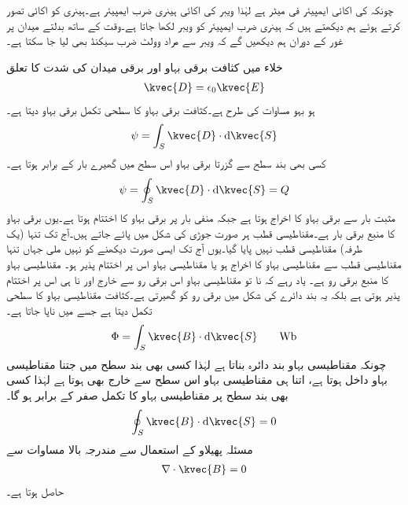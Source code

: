 چونکہ  کی اکائی ایمپیئر فی میٹر ہے لہٰذا ویبر کی اکائی ہینری ضرب ایمپیئر ہے۔ہینری کو اکائی تصور کرتے ہوئے ہم دیکھتے ہیں کہ ہینری ضرب ایمپیئر کو ویبر لکھا جاتا ہے۔وقت کے ساتھ بدلتے میدان پر غور کے دوران ہم دیکھیں گے کہ ویبر سے مراد وولٹ ضرب سیکنڈ بھی لیا جا سکتا ہے۔ 

خلاء میں کثافت برقی بہاو  اور برقی میدان کی شدت  کا تعلق
\begin{align*}
\kvec{D}=\epsilon_0 \kvec{E}
\end{align*}
ہو بہو مساوات  کی طرح ہے۔کثافت برقی بہاو کا سطحی تکمل برقی بہاو  دیتا ہے۔
\begin{align*}
\psi=\int_S \kvec{D} \cdot \dif \kvec{S}
\end{align*}
کسی بھی بند سطح سے گزرتا برقی بہاو اس سطح میں گھیرے بار  کے برابر ہوتا ہے۔
\begin{align*}
\psi=\oint_S \kvec{D} \cdot \dif \kvec{S}=Q
\end{align*}
مثبت بار سے برقی بہاو کا اخراج ہوتا ہے جبکہ منفی بار پر برقی بہاو کا اختتام ہوتا ہے۔یوں برقی بہاو کا منبع برقی بار ہے۔مقناطیسی قطب ہر صورت جوڑی کی شکل میں پائے جاتے ہیں۔آج تک تنہا (یک طرفہ) مقناطیسی قطب نہیں پایا گیا۔یوں آج تک ایسی صورت دیکھنے کو نہیں ملی جہاں تنہا مقناطیسی قطب سے مقناطیسی بہاو کا اخراج ہو یا مقناطیسی بہاو اس پر اختتام پذیر ہو۔ مقناطیسی بہاو کا منبع برقی رو ہے۔ یاد رہے کہ نا تو مقناطیسی بہاو اس برقی رو سے خارج اور نا ہی اس پر اختتام پذیر ہوتی ہے بلکہ یہ بند دائرے کی شکل میں برقی رو کو گھیرتی ہے۔کثافت مقناطیسی بہاو کا سطحی تکمل   دیتا ہے جسے   میں ناپا جاتا ہے۔
\begin{align}
\Phi=\int_S \kvec{B} \cdot \dif \kvec{S} \quad \quad \si{\weber}
\end{align} 
چونکہ مقناطیسی بہاو بند دائرہ بناتا ہے لہٰذا کسی بھی بند سطح میں جتنا مقناطیسی بہاو داخل ہوتا ہے، اتنا ہی مقناطیسی بہاو اس سطح سے خارج بھی ہوتا ہے لہٰذا کسی بھی بند سطح پر مقناطیسی بہاو کا تکمل صفر کے برابر ہو گا۔
\begin{align}\label{مساوات_مقناطیسی_مقناطیسی_بہاو_بند_سطح}
\oint_S \kvec{B} \cdot \dif \kvec{S}=0
\end{align}
مسئلہ پھیلاو کے استعمال سے مندرجہ بالا مساوات سے
\begin{align}\label{مساوات_مقناطیسی_مقناطیسی_بہاو_پھیلاو}
\nabla \cdot \kvec{B}=0
\end{align}
حاصل ہوتا ہے۔

